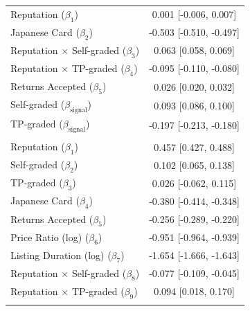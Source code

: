 \documentclass[11pt,letterpaper]{article}
\theoremstyle{definition}
\begin{document}
\begin{table}[H]
\begin{tabular}[t]{lc}
\hspace{1em}Reputation ($\beta_1$) & 0.001 [-0.006, 0.007]\\
\hspace{1em}Japanese Card ($\beta_2$) & -0.503 [-0.510, -0.497]\\
\hspace{1em}Reputation $\times$ Self-graded ($\beta_3$) & 0.063 [0.058, 0.069]\\
\hspace{1em}Reputation $\times$ TP-graded ($\beta_4$) & -0.095 [-0.110, -0.080]\\
\hspace{1em}Returns Accepted ($\beta_5$) & 0.026 [0.020, 0.032]\\
\hspace{1em}Self-graded ($\beta_{\text{signal}}$) & 0.093 [0.086, 0.100]\\
\hspace{1em}TP-graded ($\beta_{\text{signal}}$) & -0.197 [-0.213, -0.180]\\
\addlinespace[0.3em]
\multicolumn{2}{l}{\fontsize{8}{9.6}\selectfont \textbf{Sold Equation}}\\
\hspace{1em}Reputation ($\beta_1$) & 0.457 [0.427, 0.488]\\
\hspace{1em}Self-graded ($\beta_2$) & 0.102 [0.065, 0.138]\\
\hspace{1em}TP-graded ($\beta_3$) & 0.026 [-0.062, 0.115]\\
\hspace{1em}Japanese Card ($\beta_4$) & -0.380 [-0.414, -0.348]\\
\hspace{1em}Returns Accepted ($\beta_5$) & -0.256 [-0.289, -0.220]\\
\hspace{1em}Price Ratio (log) ($\beta_6$) & -0.951 [-0.964, -0.939]\\
\hspace{1em}Listing Duration (log) ($\beta_7$) & -1.654 [-1.666, -1.643]\\
\hspace{1em}Reputation $\times$ Self-graded ($\beta_8$) & -0.077 [-0.109, -0.045]\\
\hspace{1em}Reputation $\times$ TP-graded ($\beta_9$) & 0.094 [0.018, 0.170]\\
\addlinespace[0.3em]
\multicolumn{2}{l}{\fontsize{8}{9.6}\selectfont \textbf{Variance/Structural}}\\

\end{tabular}
\end{table}
\end{document}
